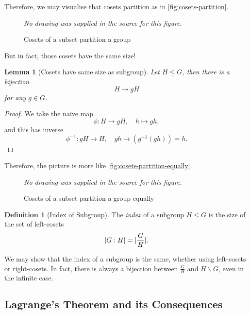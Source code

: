 \documentclass{article}
\newtheorem{lemma}[theorem]{Lemma}
\theoremstyle{definition}
\newtheorem{definition}[theorem]{Definition}
\theoremstyle{remark}
\DeclarePairedDelimiter{\abs}{\lvert}{\rvert}
\newcommand{\pqty}[1]{\left(#1\right)}
\newcommand{\flatfrac}[2]{\frac{#1}{#2}}
\newcommand{\function}[5]{#1:#2\to #3,\quad #4\mapsto #5}
\newcommand{\inverse}{^{-1}}
\newcommand{\subgroup}{\leq}
\begin{document}
Therefore, we may visualise that cosets partition as in \autoref{fig:cosets-partition}.

\begin{figure}[ht!]
    \centering
    \emph{No drawing was supplied in the source for this figure.}\par
\caption{Cosets of a subset partition a group}
    \label{fig:cosets-partition}
\end{figure}

But in fact, those cosets have the same size!

\begin{lemma}[Cosets have same size as subgroup]
    \label{lem:cosets-size}%
    Let \(H \subgroup G\), then there is a bijection
    \[
        H \to gH
    \]
    for any \(g \in G\).
\end{lemma}

\begin{proof}
    We take the na\"{i}ve map
    \[
        \function{\phi}{H}{gH}{h}{gh,}
    \]
    and this has inverse
    \[
        \function{\phi\inverse}{gH}{H}{gh}{\pqty{g\inverse \pqty{gh}} = h.}
    \]
\end{proof}

Therefore, the picture is more like \autoref{fig:cosets-partition-equally}.

\begin{figure}[ht!]
    \centering
    \emph{No drawing was supplied in the source for this figure.}\par
\caption{Cosets of a subset partition a group equally}
    \label{fig:cosets-partition-equally}
\end{figure}

\begin{definition}[Index of Subgroup]
    \label{def:index-of-subgroup}%
    The \emph{index} of a subgroup \(H \subgroup G\) is the size of the set of left-cosets
    \[
        \abs{G : H} = \abs{\flatfrac{G}{H}}.
    \]
\end{definition}

We may show that the index of a subgroup is the same, whether using left-cosets or right-cosets. In fact, there is always a bijection between \(\flatfrac{G}{H}\) and \(H \backslash G\), even in the infinite case.

\subsection{Lagrange's Theorem and its Consequences}
\label{sec:lagrange-consequences}
\end{document}
